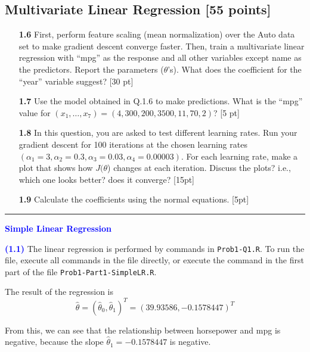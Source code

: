 \documentclass[a4paper,12pt]{article}
\newcommand{\quotes}[1]{``#1''}
\newcommand{\code}[1]{\texttt{#1}}
\newcommand{\qnum}[1]{\noindent\textcolor{blue}{\textbf{(#1)}}}
\newcommand{\sep}{\begin{center}\textcolor{gray}{\rule{\textwidth}{0.75pt}}\end{center}}
\begin{document}
\subsection*{ Multivariate Linear Regression  [55 points]} 



\begin{enumerate}
  \item[\textbf{1.6}] First, perform feature scaling (mean normalization) over the Auto data set to make gradient descent converge faster. Then, train a multivariate linear regression with \quotes{mpg} as the response and  all other variables  except name as the predictors.  Report the parameters ($\theta$'s). What does the coefficient for the \quotes{year} variable suggest? [30 pt]
  \item[\textbf{1.7}]   Use the model obtained in Q.1.6 to make predictions. What is the \quotes{mpg} value for $(x_1,\ldots,x_7) =  (4,300,200,3500,11,70,2)$?  [5 pt]
\item[\textbf{1.8}]In this question, you are asked to test different learning rates. Run your gradient descent for 100 iterations at the chosen learning rates $(\alpha_1 = 3,  \alpha_2 = 0.3, \alpha_3 = 0.03,   \alpha_4 = 0.00003)$. For each learning rate, make a plot that shows how $J(\theta$) changes at each iteration. Discuss the plots? i.e., which one looks better? does it converge? [15pt]
\item[\textbf{1.9}] Calculate the  coefficients using the normal equations. [5pt]
\end{enumerate}

\sep 

\noindent\textcolor{blue}{\textbf{Simple Linear Regression}}\bigskip 

\qnum{1.1}
The linear regression is performed by commands in \code{Prob1-Q1.R}. To run the file, execute all commands in the file directly, or execute the command in the first part of the file \code{Prob1-Part1-SimpleLR.R}.

The result of the regression is 
\[
    \hat\theta = (\hat\theta_0, \hat\theta_1)^T
    = (39.93586, -0.1578447)^T
\]

From this, we can see that the relationship between horsepower and mpg is negative, because the slope $\hat\theta_1 = -0.1578447$ is negative.
\bigskip
\end{document}
